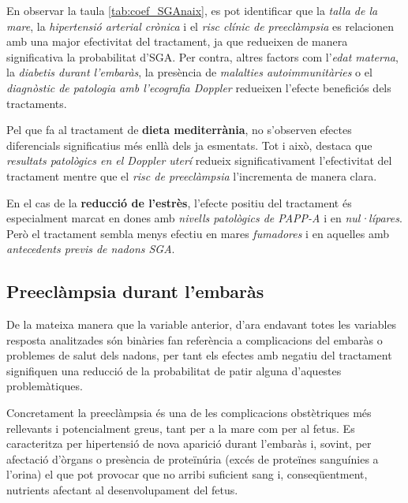 \documentclass[../main.tex]{subfiles}
\begin{document}
    En observar la taula \ref{tab:coef_SGAnaix}, es pot identificar que la \textit{talla de la mare}, la \textit{hipertensió arterial crònica} i el \textit{risc clínic de preeclàmpsia} es relacionen amb una major efectivitat del tractament, ja que redueixen de manera significativa la probabilitat d’SGA. Per contra, altres factors com l’\textit{edat materna}, la \textit{diabetis durant l’embaràs}, la presència de \textit{malalties autoimmunitàries} o el \textit{diagnòstic de patologia amb l'ecografia Doppler} redueixen l’efecte beneficiós dels tractaments.\par
    Pel que fa al tractament de \textbf{dieta mediterrània}, no s’observen efectes diferencials significatius més enllà dels ja esmentats. Tot i això, destaca que  \textit{resultats patològics en el Doppler uterí} redueix significativament l’efectivitat del tractament mentre que el \textit{risc de preeclàmpsia} l’incrementa de manera clara.\par
    En el cas de la \textbf{reducció de l'estrès}, l’efecte positiu del tractament és especialment marcat en dones amb \textit{nivells patològics de PAPP-A} i en \textit{nul·lípares}. Però el tractament sembla menys efectiu en mares \textit{fumadores} i en aquelles amb \textit{antecedents previs de nadons SGA}.




    \subsection{Preeclàmpsia durant l’embaràs}\label{subsec:PE}

    De la mateixa manera que la variable anterior, d'ara endavant totes les variables resposta analitzades són binàries fan referència a complicacions del embaràs o problemes de salut dels nadons, per tant els efectes amb negatiu del tractament signifiquen una reducció de la probabilitat de patir alguna d'aquestes problemàtiques.\par
    Concretament la preeclàmpsia és una de les complicacions obstètriques més rellevants i potencialment greus, tant per a la mare com per al fetus. Es caracteritza per hipertensió de nova aparició durant l’embaràs i, sovint, per afectació d’òrgans o presència de proteïnúria (excés de proteïnes sanguínies a l'orina) el que pot provocar que no arribi suficient sang i, conseqüentment, nutrients afectant al desenvolupament del fetus.
    
\end{document}
